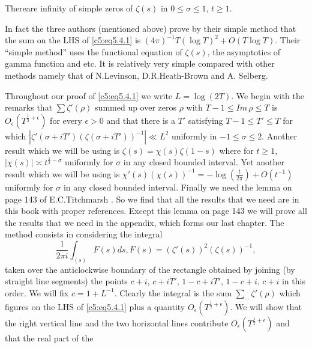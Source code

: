 \begin{theorem}\label{c5:thm5.4.1}
There\pageoriginale are infinity of simple zeros of $\zeta(s)$ in
$0\leq\sigma\leq 1$, $t\geq 1$.
\end{theorem}

\begin{remark*}
In fact the three authors (mentioned above) prove by their simple
method that the sum on the LHS of \eqref{c5:eq5.4.1} is
$(4\pi)^{-1}T(\log T)^{2}+O(T\log T)$. Their ``simple method'' uses
the functional equation of $\zeta(s)$, the asymptotics of gamma
function and etc. It is relatively very simple compared with other
methods namely that of N.\@ Levinson, D.R.\@ Heath-Brown and A.\@
Selberg.
\end{remark*}

Throughout our proof of \eqref{c5:eq5.4.1} we write
$L=\log(2T)$. We begin with the remarks that $\sum \zeta'(\rho)$
summed up over zeros $\rho$ with $T-1\leq Im \, \rho\leq T$ is
$O_{\epsilon}(T^{\frac{1}{2}+\epsilon})$ for every $\epsilon>0$ and
that there is a $T'$ satisfying $T-1\leq T'\leq T$ for which
$|\zeta'(\sigma+iT')(\zeta(\sigma+iT'))^{-1}|\ll L^{2}$ uniformly in
$-1\leq \sigma\leq 2$. Another result which we will be using is
$\zeta(s)=\chi(s)\zeta(1-s)$ where for $t\geq 1$, $|\chi(s)|\asymp
t^{\frac{1}{2}-\sigma}$ uniformly for $\sigma$ in any closed bounded
interval. Yet another result which we will be using is
$\chi'(s)(\chi(s))^{-1}=-\log(\frac{t}{2\pi})+O(t^{-1})$ uniformly for
$\sigma$ in any closed bounded interval. Finally we need the lemma on
page 143 of E.C.\@ Titchmarsh \cite{Titchmarsh1}. So we find that all the
results that we need are in this book with proper references. Except
this lemma on page 143 we will prove all the results that we need in
the appendix, which forms our last chapter. The method consists in
considering the integral
\begin{equation*}
\frac{1}{2\pi i}\int_{(s)}F(s)ds,
F(s)=(\zeta'(s))^{2}(\zeta(s))^{-1},\tag{5.4.2}\label{c5:eq5.4.2} 
\end{equation*}
taken over the anticlockwise boundary of the rectangle obtained by
joining (by straight line segments) the points $c+i$, $c+iT'$,
$1-c+iT'$, $1-c+i$, $c+i$ in this order. We will fix
$c=1+L^{-1}$. Clearly the integral is the sum
$\sum\limits_{\cdots}\zeta'(\rho)$ which figures on the LHS of
\eqref{c5:eq5.4.1} plus a quantity
$O_{\epsilon}(T^{\frac{1}{2}+\epsilon})$. We will show that the right
vertical line and the two horizontal lines contribute
$O_{\epsilon}(T^{\frac{1}{2}+\epsilon})$ and that the real part of the
